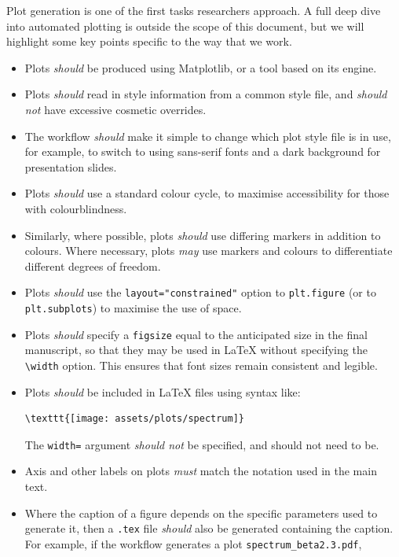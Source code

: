\documentclass{article}
\newcommand\rfcword[1]{\emph{#1}\xspace}
\newcommand\must{\rfcword{must}}
\newcommand\should{\rfcword{should}}
\newcommand\shouldnot{\rfcword{should not}}
\newcommand\may{\rfcword{may}}
\newcommand\filename[1]{\texttt{#1}\xspace}
\begin{document}
Plot generation is one of the first tasks researchers approach.
A full deep dive into automated plotting is outside the scope of this document,
but we will highlight some key points specific to the way that we work.

\begin{itemize}
  \item
        Plots \should be produced using Matplotlib,
        or a tool based on its engine.
  \item
        Plots \should read in style information from a common style file,
        and \shouldnot have excessive cosmetic overrides.
  \item
        The workflow \should make it simple to change which plot style file is in use,
        for example,
        to switch to using sans-serif fonts and a dark background
        for presentation slides.
  \item
        Plots \should use a standard colour cycle,
        to maximise accessibility for those with colourblindness.
  \item
        Similarly,
        where possible,
        plots \should use differing markers in addition to colours.
        Where necessary,
        plots \may use markers and colours to differentiate different degrees of freedom.
  \item
        Plots \should use the \verb|layout="constrained"| option to \verb|plt.figure|
        (or to \verb|plt.subplots|)
        to maximise the use of space.
  \item
        Plots \should specify a \verb|figsize|
        equal to the anticipated size in the final manuscript,
        so that they may be used in LaTeX without specifying the \verb|\width| option.
        This ensures that font sizes remain consistent and legible.
  \item
        Plots \should be included in LaTeX files using syntax like:
\begin{verbatim}
\texttt{[image: assets/plots/spectrum]}
\end{verbatim}
        The \texttt{width=} argument \shouldnot be specified,
        and should not need to be.
  \item
        Axis and other labels on plots \must match the notation used in the main text.
  \item
        Where the caption of a figure depends on the specific parameters used to generate it,
        then a \filename{.tex} file \should also be generated containing the caption.
        For example,
        if the workflow generates a plot \filename{spectrum\_beta2.3.pdf},

\end{itemize}
\end{document}
